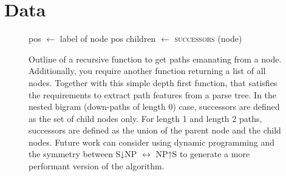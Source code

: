 \documentclass[11pt,a4paper]{article}
\begin{document}
\section{Data}
\begin{figure}
    \centering

\begin{algorithmic}[1]

    \State pos $\gets$ label of node
    \Return pos \EndIf
    \State children $\gets$ \textsc{successors} (node)
    \State {}
\EndFunction
\end{algorithmic}
    \caption{Outline of a recursive function to get paths emanating from a node. Additionally, you require another function returning a list of all nodes. Together with this simple depth first function, that satisfies the requirements to extract path features from a parse tree. In the nested bigram (down-paths of length 0) case, successors are defined as the set of child nodes only. For length 1 and length 2 paths, successors are defined as the union of the parent node and the child nodes. Future work can consider using dynamic programming and the symmetry between S↓NP $\leftrightarrow$ NP↑S to generate a more performant version of the algorithm.}
    \label{fig:tree_algo}
\end{figure}
\end{document}
